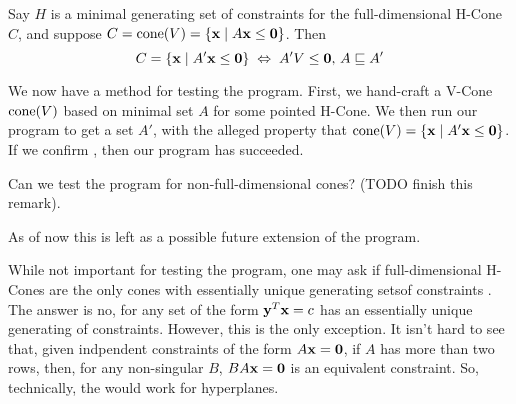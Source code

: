 \begin{EqCriteria}\label{eq_vc_hc}
	Say $H$ is a minimal generating set of constraints for the full-dimensional H-Cone $C$, and suppose $C = \operatorname{cone}(V) = \left\{\mathbf{x}\;|\; A\mathbf{x}\leq\mathbf{0}\right\}$.  Then
	\[ C = \left\{\mathbf{x}\;|\; A'\mathbf{x}\leq\mathbf{0}\right\} \;\Leftrightarrow\; A'V\leq\mathbf{0},\, A \sqsubseteq A' \]
\end{EqCriteria}

\begin{Test}\label{test_vc_to_hc}
	We now have a method for testing the program.  First, we hand-craft a V-Cone $\operatorname{cone}(V)$ based on minimal set $A$ for some pointed H-Cone. We then run our program to get a set $A'$, with the alleged property that $\operatorname{cone}(V) = \left\{\mathbf{x}\;|\; A'\mathbf{x}\leq\mathbf{0}\right\}$.  If we confirm , then our program has succeeded.
\end{Test}

\begin{Remark}
	Can we test the program for non-full-dimensional cones?  (TODO finish this remark).

	As of now this is left as a possible future extension of the program.
\end{Remark}

\begin{Remark}
	While not important for testing the program, one may ask if full-dimensional H-Cones are the only cones with essentially unique generating setsof constraints .  The answer is no, for any set of the form $\mathbf{y}^T \mathbf{x} = c$ has an essentially unique generating of constraints.  However, this is the only exception.  It isn't hard to see that, given indpendent constraints of the form $A\mathbf{x}=\mathbf{0}$, if $A$ has more than two rows, then, for any non-singular $B$, $BA\mathbf{x}=\mathbf{0}$ is an equivalent constraint.  So, technically, the  would work for hyperplanes.
\end{Remark}

